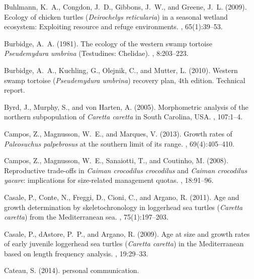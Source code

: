 \documentclass{article}
\begin{document}
\begin{thebibliography}{}
Buhlmann, K.~A., Congdon, J.~D., Gibbons, J.~W., and Greene, J.~L. (2009).
\newblock Ecology of chicken turtles (\emph{Deirochelys reticularia}) in a
  seasonal wetland ecosystem: Exploiting resource and refuge environments.
, 65(1):39--53.

Burbidge, A.~A. (1981).
\newblock The ecology of the western swamp tortoise \emph{Pseudemydura umbrina}
  ({T}estudines: {C}helidae).
, 8:203--223.

Burbidge, A.~A., Kuchling, G., Olejnik, C., and Mutter, L. (2010).
\newblock Western swamp tortoise (\emph{Pseudemydura umbrina}) recovery plan,
  4th edition.
\newblock Technical report.

Byrd, J., Murphy, S., and von Harten, A. (2005).
\newblock Morphometric analysis of the northern subpopulation of
  \textit{Caretta caretta} in {S}outh {C}arolina, {U}{S}{A}.
, 107:1--4.

Campos, Z., Magnusson, W.~E., and Marques, V. (2013).
\newblock Growth rates of \emph{Paleosuchus palpebrosus} at the southern limit
  of its range.
, 69(4):405--410.

Campos, Z., Magnusson, W.~E., Sanaiotti, T., and Coutinho, M. (2008).
\newblock Reproductive trade-offs in \emph{Caiman crocodilus crocodilus} and
  \emph{Caiman crocodilus yacare}: implications for size-related management
  quotas.
, 18:91--96.

Casale, P., Conte, N., Freggi, D., Cioni, C., and Argano, R. (2011).
\newblock Age and growth determination by skeletochronology in loggerhead sea
  turtles (\textit{Caretta caretta}) from the {M}editerranean sea.
, 75(1):197--203.

Casale, P., dAstore, P.~P., and Argano, R. (2009).
\newblock Age at size and growth rates of early juvenile loggerhead sea turtles
  (\textit{Caretta caretta}) in the {M}editerranean based on length frequency
  analysis.
, 19:29--33.

Cateau, S. (2014).
\newblock personal communication.


\end{thebibliography}
\end{document}
